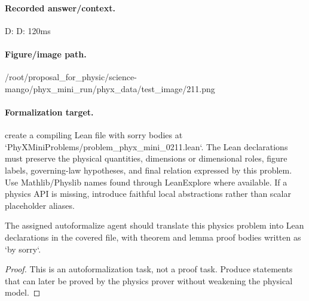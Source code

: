 \paragraph{Recorded answer/context.}
D: D: 120ms

\paragraph{Figure/image path.}
/root/proposal\_for\_physic/science-mango/phyx\_mini\_run/phyx\_data/test\_image/211.png

\paragraph{Formalization target.}
create a compiling Lean file with sorry bodies at `PhyXMiniProblems/problem\_phyx\_mini\_0211.lean`. The Lean declarations must preserve the physical quantities, dimensions or dimensional roles, figure labels, governing-law hypotheses, and final relation expressed by this problem.
Use Mathlib/Physlib names found through LeanExplore where available. If a physics API is missing, introduce faithful local abstractions rather than scalar placeholder aliases.

\begin{theorem}
\label{thm:physics:phyx_mini_0211:target}
The assigned autoformalize agent should translate this physics problem into Lean declarations in the covered file, with theorem and lemma proof bodies written as `by sorry`.
\end{theorem}
\begin{proof}
This is an autoformalization task, not a proof task. Produce statements that can later be proved by the physics prover without weakening the physical model.
\end{proof}

